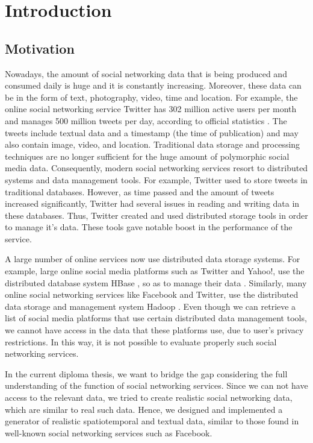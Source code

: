 \chapter{Introduction}

\section{Motivation}

Nowadays, the amount of social networking data that is being produced and consumed daily is huge and it is constantly increasing.
Moreover, these data can be in the form of text, photography, video, time and location. For example, the online social networking service Twitter 
has 302 million active users per month and manages 500 million tweets per day, according to official statistics \cite {1}. 
The tweets include textual data and a timestamp (the time of publication) and may also contain
image, video, and location. Traditional data storage and processing techniques are no longer sufficient for the huge amount of polymorphic 
social media data. Consequently, modern social networking services
resort to distributed systems and data management tools. For example, Twitter \cite {2} used to 
store tweets in traditional databases. However, as time passed and the amount of tweets increased significantly, Twitter had several issues in 
reading and writing data in these databases. Thus, Twitter created and used distributed storage tools in order to manage it's data. 
These tools gave notable boost in the performance of the service.

A large number of online services now use distributed data storage systems. For example, large online social media platforms 
such as Twitter and Yahoo!, use the distributed database system HBase \cite {3}, so as to manage their data \cite {4}. 
Similarly, many online social networking services like Facebook and Twitter,
use the distributed data storage and management system Hadoop \cite {5} \cite {6}. 
Even though we can retrieve a list of social media platforms that use certain distributed data management tools, 
we cannot have access in the data that these platforms use, due to user's privacy restrictions. 
In this way, it is not possible to 
evaluate properly such social networking services.

In the current diploma thesis, we want to bridge the gap considering the full understanding of the function of social networking services.
Since we can not have access to the relevant data, we tried to create realistic social networking data, which are similar to real such data.
Hence, we designed and implemented a generator of realistic spatiotemporal and textual data, similar to 
those found in well-known social networking services such as Facebook.

